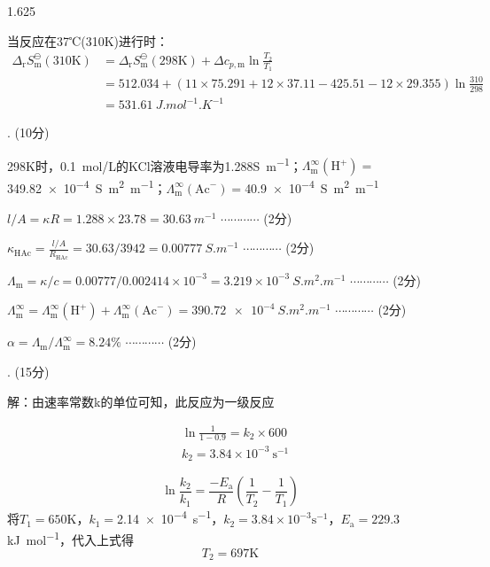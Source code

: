 \documentclass[12pt, b5paper]{article}
\begin{document}
\begin{spacing}{1.625}
\vspace{-2em}

当反应在37℃(310K)进行时：
\[
    \begin{aligned}
    \Delta_\mathrm{r} S_\mathrm{m}^\ominus (310\mathrm{K}) & = \Delta_\mathrm{r} S_\mathrm{m}^\ominus(298\mathrm{K}) + \Delta c_{p,\mathrm{m}} \ln \frac{T_2}{T_1} \\
    & = 512.034 + (11\times 75.291 + 12\times 37.11 - 425.51 - 12\times 29.355)\ln \frac{310}{298} \\
    & = 531.61 \ \si{J.mol^{-1}.K^{-1}}
    \end{aligned}
\]

\vspace{-2em}

. (10分)

298K时，\SI{0.1}{mol/L}的KCl溶液电导率为1.288\si{S.m^{-1}}；$\Lambda_\mathrm{m}^\infty (\mathrm{H}^+) = $\SI{349.82e-4}{S.m^2.m^{-1}}；$\Lambda_\mathrm{m}^\infty (\mathrm{Ac}^-) = $\SI{40.9e-4}{S.m^2.m^{-1}}

$l/A = \kappa R = 1.288 \times 23.78 = 30.63 \ \si{m^{-1}} $ \hfill $\cdots \cdots \cdots \cdots$ (2分)

$\kappa_\mathrm{HAc} = \frac{l/A}{R_\mathrm{HAc}} = 30.63/3942 = 0.00777 \ \si{S.m^{-1}}$ \hfill $\cdots \cdots \cdots \cdots$ (2分)

$\Lambda_\mathrm{m}= \kappa /c = 0.00777/0.002414 \times 10^{-3} = 3.219\times 10^{-3} \ \si{S.m^2.m^{-1}}$ \hfill $\cdots \cdots \cdots \cdots$ (2分)
 
$\Lambda_\mathrm{m}^\infty = \Lambda_\mathrm{m}^\infty (\mathrm{H}^+) + \Lambda_\mathrm{m}^\infty (\mathrm{Ac}^-) = \SI{390.72e-4}{S.m^2.m^{-1}} $ \hfill $\cdots \cdots \cdots \cdots$ (2分)

$\alpha  = \Lambda_\mathrm{m}/\Lambda_\mathrm{m}^\infty = 8.24\%$ \hfill $\cdots \cdots \cdots \cdots$ (2分)

. (15分)

解：由速率常数k的单位可知，此反应为一级反应

\vspace{-2em}
\[
    \begin{aligned}
        &\ln \frac{1}{1-0.9}=k_2 \times 600 \\
        &k_2 = 3.84 \times 10^{-3} \ \mathrm{s^{-1}}
    \end{aligned}
\]

\vspace{-2em}
\[
    \ln \frac{k_{2}}{k_{1}}=\frac{-E_{\mathrm{a}}}{R}(\frac{1}{T_{2}}-\frac{1}{T_{1}})
\]
将$T_1=650 \mathrm{K}$，$k_1=$\SI{2.14e-4}{s^{-1}}，$k_2 = 3.84 \times 10^{-3} \mathrm{s^{-1}}$，$E_\mathrm{a}=229.3$ \si{kJ.mol^{-1}}，代入上式得
\[
    T_2 = 697 \mathrm{K}
\]

\vspace{-2em}

\end{spacing}
\end{document}
